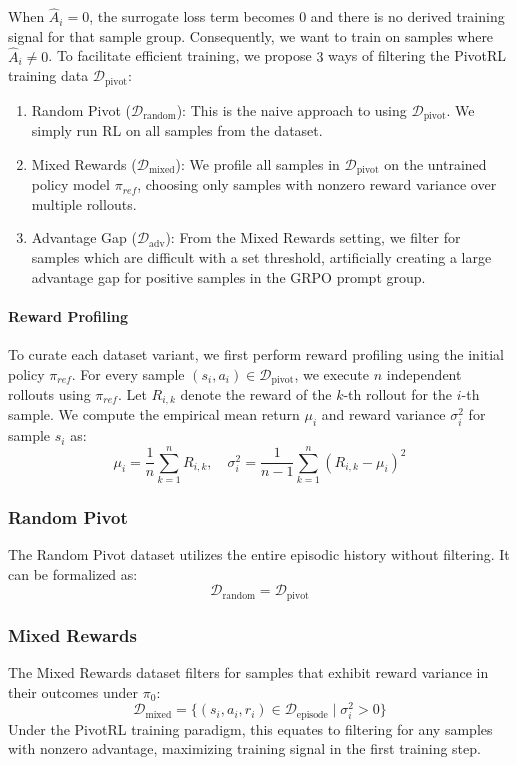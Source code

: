 When $\hat{A}_i = 0$, the surrogate loss term becomes $0$ and there is no derived training signal for that sample group. Consequently, we want to train on samples where $\hat{A}_i \not = 0$. To facilitate efficient training, we propose $3$ ways of filtering the PivotRL training data $\mathcal{D}_{\text{pivot}}$:
\begin{enumerate}
    \item Random Pivot ($\mathcal{D}_{\text{random}}$): This is the naive approach to using $\mathcal{D}_{\text{pivot}}$. We simply run RL on all samples from the dataset.
    \item Mixed Rewards ($\mathcal{D}_{\text{mixed}}$): We profile all samples in $\mathcal{D}_{\text{pivot}}$ on the untrained policy model $\pi_{ref}$, choosing only samples with nonzero reward variance over multiple rollouts.
    \item Advantage Gap ($\mathcal{D}_{\text{adv}}$): From the Mixed Rewards setting, we filter for samples which are difficult with a set threshold, artificially creating a large advantage gap for positive samples in the GRPO prompt group.
\end{enumerate}

\paragraph{Reward Profiling}
To curate each dataset variant, we first perform reward profiling using the initial policy $\pi_{ref}$. For every sample $(s_i, a_i) \in \mathcal{D}_{\text{pivot}}$, we execute $n$ independent rollouts using $\pi_{ref}$. Let $R_{i,k}$ denote the reward of the $k$-th rollout for the $i$-th sample. We compute the empirical mean return $\mu_i$ and reward variance $\sigma^2_i$ for sample $s_i$ as:
\begin{equation}
    \mu_i = \frac{1}{n} \sum_{k=1}^n R_{i,k}, \quad \sigma^2_i = \frac{1}{n-1} \sum_{k=1}^n (R_{i,k} - \mu_i)^2
\end{equation}

\subsubsection{Random Pivot}
The Random Pivot dataset utilizes the entire episodic history without filtering. It can be formalized as:
\begin{equation}
    \mathcal{D}_{\text{random}} = \mathcal{D}_{\text{pivot}}
\end{equation}

\subsubsection{Mixed Rewards}
The Mixed Rewards dataset filters for samples that exhibit reward variance in their outcomes under $\pi_0$:
\begin{equation}
    \mathcal{D}_{\text{mixed}} = \{ (s_i, a_i, r_i) \in \mathcal{D}_{\text{episode}} \mid \sigma^2_i > 0 \}
\end{equation}
Under the PivotRL training paradigm, this equates to filtering for any samples with nonzero advantage, maximizing training signal in the first training step.

